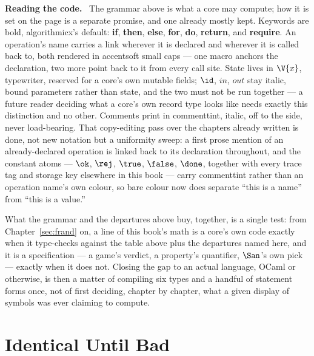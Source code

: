 \documentclass[10pt,oneside,openany]{book}
\newcommand{\heading}[1]{\medskip\par\noindent\textcolor{accent}{\textbf{#1.}}\ }
\theoremstyle{accentdef}
\theoremstyle{accentplain}
\begin{document}
\heading{Reading the code} The grammar above is what a core may compute; how it is set on the
page is a separate promise, and one already mostly kept. Keywords are bold, algorithmicx's
default: \textbf{if}, \textbf{then}, \textbf{else}, \textbf{for}, \textbf{do}, \textbf{return},
and \textbf{require}. An operation's name carries a link wherever it is declared and wherever it
is called back to, both rendered in \textcolor{accentsoft}{accentsoft} small caps --- one macro
anchors the declaration, two more point back to it from every call site. State lives in $\V{x}$,
typewriter, reserved for a core's
own mutable fields; $\id$, $in$, $out$ stay italic, bound parameters rather than state, and the
two must not be run together --- a future reader deciding what a core's own record type looks
like needs exactly this distinction and no other. Comments print in
\textcolor{commenttint}{commenttint}, italic, off to the side, never load-bearing. That
copy-editing pass over the chapters already written is done, not new notation but a uniformity
sweep: a first prose mention of an already-declared operation is linked back to its declaration
throughout, and the constant atoms --- $\ok$, $\rej$, $\true$, $\false$, $\done$, together with
every trace tag and storage key elsewhere in this book --- carry
\textcolor{commenttint}{commenttint} rather than an operation name's own colour, so bare colour
now does separate ``this is a name'' from ``this is a value.''

What the grammar and the departures above buy, together, is a single test: from
Chapter~\ref{sec:frand} on, a line of this book's math is a core's own code exactly when it
type-checks against the table above plus the departures named here, and it is a specification ---
a game's verdict, a property's quantifier, $\San$'s own $\mathrm{pick}$ --- exactly when it does
not. Closing the gap to an actual language, OCaml or otherwise, is then a matter of compiling six
types and a handful of statement forms once, not of first deciding, chapter by chapter, what a
given display of symbols was ever claiming to compute.

\chapter{Identical Until Bad}\label{app:iub}
\end{document}
